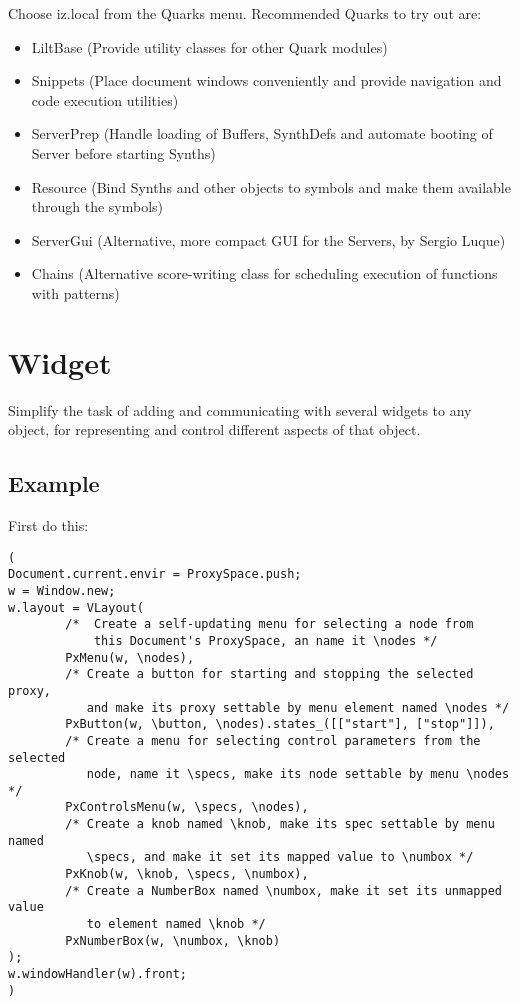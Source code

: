 \documentclass[11pt, a4paper]{scrartcl}
\begin{document}
Choose iz.local from the Quarks menu.  Recommended Quarks to try out are: 

\begin{itemize}
\item LiltBase (Provide utility classes for other Quark modules)
\item Snippets (Place document windows conveniently and provide navigation and code execution utilities)
\item ServerPrep (Handle loading of Buffers, SynthDefs and automate booting of Server before starting Synths)
\item Resource (Bind Synths and other objects to symbols and make them available through the symbols)
\item ServerGui (Alternative, more compact GUI for the Servers, by Sergio Luque)
\item Chains (Alternative score-writing class for scheduling execution of functions with patterns)
\end{itemize}
\section*{Widget}
\label{sec-5}


Simplify the task of adding and communicating with several widgets to any object, for representing and control different aspects of that object. 
\subsection*{Example}
\label{sec-5_1}


First do this: 

\begin{verbatim}
(
Document.current.envir = ProxySpace.push;
w = Window.new;
w.layout = VLayout(
        /*  Create a self-updating menu for selecting a node from 
            this Document's ProxySpace, an name it \nodes */
        PxMenu(w, \nodes),
        /* Create a button for starting and stopping the selected proxy,
           and make its proxy settable by menu element named \nodes */
        PxButton(w, \button, \nodes).states_([["start"], ["stop"]]),
        /* Create a menu for selecting control parameters from the selected
           node, name it \specs, make its node settable by menu \nodes */
        PxControlsMenu(w, \specs, \nodes),
        /* Create a knob named \knob, make its spec settable by menu named 
           \specs, and make it set its mapped value to \numbox */
        PxKnob(w, \knob, \specs, \numbox),
        /* Create a NumberBox named \numbox, make it set its unmapped value
           to element named \knob */
        PxNumberBox(w, \numbox, \knob)
);
w.windowHandler(w).front;
)
\end{verbatim}
\end{document}
